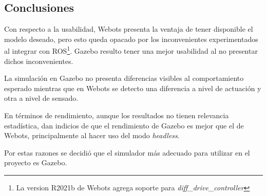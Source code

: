 \subsection{Conclusiones}

Con respecto a la usabilidad, Webots presenta la ventaja de tener
disponible el modelo deseado, pero esto queda opacado por los inconvenientes
experimentados al integrar con ROS\footnote{La version R2021b de
Webots agrega soporte para \emph{diff\_drive\_controller}}. Gazebo resulto tener una mejor usabilidad al no presentar dichos
inconvenientes.

La simulación en Gazebo no presenta diferencias visibles al comportamiento
esperado mientras que en Webots se detecto una diferencia a nivel de actuación
y otra a nivel de sensado.

En términos de rendimiento, aunque los resultados no tienen relevancia estadística,
dan indicios de que el rendimiento de Gazebo es mejor que el de Webots,
principalmente al hacer uso del modo \emph{headless}.

Por estas razones se decidió que el simulador más adecuado para utilizar en el
proyecto es Gazebo.
